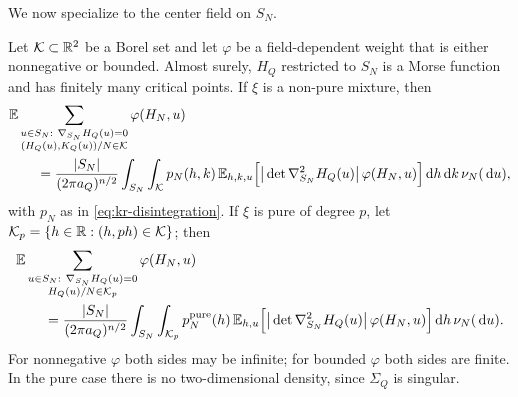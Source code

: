 We now specialize to the center field on $S_N$.

\begin{theorem}\label{thm:kr-marked}
Let $\mathcal K\subset\mathbb R^2$ be a Borel set and let $\varphi$ be a field-dependent weight that is either nonnegative or bounded. Almost surely, $H_Q$ restricted to $S_N$ is a Morse function and has finitely many critical points. If $\xi$ is a non-pure mixture, then
\begin{equation}\label{eq:kr-marked-mixed}
\begin{aligned}
&\mathbb E\sum_{\substack{u\in S_N:\ \nabla_{S_N}H_Q(u)=0\\ (H_Q(u),K_Q(u))/N\in\mathcal K}}\varphi(H_N,u)\\
&\qquad=\frac{|S_N|}{(2\pi a_Q)^{n/2}}\int_{S_N}\int_{\mathcal K}p_N(h,k)\,\mathbb E_{h,k,u}\Big[\big|\det\nabla^2_{S_N}H_Q(u)\big|\,\varphi(H_N,u)\Big]\,\mathrm d h\,\mathrm d k\,\nu_N(\,\mathrm d u),
\end{aligned}
\end{equation}
with $p_N$ as in \eqref{eq:kr-disintegration}. If $\xi$ is pure of degree $p$, let $\mathcal K_p=\{h\in\mathbb R:(h,ph)\in\mathcal K\}$; then
\begin{equation}\label{eq:kr-marked-pure}
\begin{aligned}
&\mathbb E\sum_{\substack{u\in S_N:\ \nabla_{S_N}H_Q(u)=0\\ H_Q(u)/N\in\mathcal K_p}}\varphi(H_N,u)\\
&\qquad=\frac{|S_N|}{(2\pi a_Q)^{n/2}}\int_{S_N}\int_{\mathcal K_p}p^{\rm pure}_N(h)\,\mathbb E_{h,u}\Big[\big|\det\nabla^2_{S_N}H_Q(u)\big|\,\varphi(H_N,u)\Big]\,\mathrm d h\,\nu_N(\,\mathrm d u).
\end{aligned}
\end{equation}
For nonnegative $\varphi$ both sides may be infinite; for bounded $\varphi$ both sides are finite. In the pure case there is no two-dimensional density, since $\Sigma_Q$ is singular.
\end{theorem}


